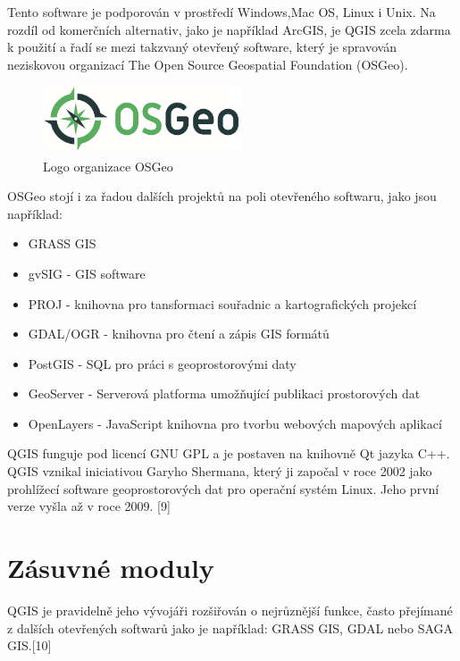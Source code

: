 \documentclass[a4paper,oneside,12pt]{book}
\begin{document}
\hspace{10mm} Tento software je podporován v prostředí Windows,Mac OS, Linux i Unix. Na rozdíl od komerčních alternativ, jako je například ArcGIS, je QGIS zcela zdarma k použití a řadí se mezi takzvaný otevřený software, který je spravován neziskovou organizací The Open Source Geospatial Foundation (OSGeo).

\begin{figure}[ht] \label{obr3}
\centering
\includegraphics[height=2cm]{pictures/Osgeo.png}
\caption{ Logo organizace OSGeo}
\label{fig:OSGEO}
\end{figure}

\hspace{10mm} OSGeo stojí i za řadou dalších projektů na poli otevřeného softwaru, jako jsou například:
\begin{itemize}
\item GRASS GIS 
\item gvSIG - GIS software
\item PROJ - knihovna pro tansformaci souřadnic a kartografických projekcí
\item GDAL/OGR - knihovna pro čtení a zápis GIS formátů
\item PostGIS - SQL pro práci s geoprostorovými daty
\item GeoServer - Serverová platforma umožňující publikaci prostorových dat 
\item OpenLayers - JavaScript knihovna pro tvorbu webových mapových aplikací
\end{itemize}


\hspace{10mm} QGIS funguje pod licencí GNU GPL a je postaven na knihovně Qt jazyka C++. QGIS vznikal iniciativou Garyho Shermana, který ji započal v roce 2002 jako prohlížecí software geoprostorových dat pro operační systém Linux. Jeho první verze vyšla až v roce 2009. [9]

 \section{Zásuvné moduly} \label{moduly}

\hspace{10mm} QGIS je pravidelně jeho vývojáři rozšiřován o nejrůznější funkce, často přejímané z dalších otevřených softwarů jako je například: GRASS GIS, GDAL nebo SAGA GIS.[10]
\end{document}
